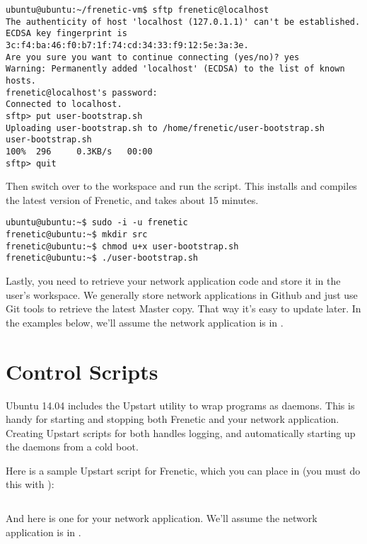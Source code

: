 \begin{verbatim}
ubuntu@ubuntu:~/frenetic-vm$ sftp frenetic@localhost
The authenticity of host 'localhost (127.0.1.1)' can't be established.
ECDSA key fingerprint is 3c:f4:ba:46:f0:b7:1f:74:cd:34:33:f9:12:5e:3a:3e.
Are you sure you want to continue connecting (yes/no)? yes
Warning: Permanently added 'localhost' (ECDSA) to the list of known hosts.
frenetic@localhost's password:
Connected to localhost.
sftp> put user-bootstrap.sh
Uploading user-bootstrap.sh to /home/frenetic/user-bootstrap.sh
user-bootstrap.sh                                                                                 100%  296     0.3KB/s   00:00
sftp> quit
\end{verbatim}

Then switch over to the  workspace and run the script.  This installs and 
compiles the latest version of Frenetic, and takes about 15 minutes.

\begin{verbatim}
ubuntu@ubuntu:~$ sudo -i -u frenetic
frenetic@ubuntu:~$ mkdir src
frenetic@ubuntu:~$ chmod u+x user-bootstrap.sh
frenetic@ubuntu:~$ ./user-bootstrap.sh
\end{verbatim}

Lastly, you need to retrieve your network application code and store it in the 
user's workspace.  We generally store network applications
in Github and just use Git tools to retrieve the latest Master copy.  That way it's easy to 
update later.  In the examples below, we'll assume the network application is in 
.  

\section{Control Scripts}

Ubuntu 14.04 includes the Upstart utility to wrap programs as daemons.  This is handy for 
starting and stopping both Frenetic and your network application.  Creating Upstart scripts
for both handles logging, and automatically starting up the daemons from a cold boot.

Here is a sample Upstart script for Frenetic, which you can place in 
 (you must do this with ):

\inputminted{bash}{code/productionalizing/frenetic.conf} 

And here is one for your network application.  We'll assume the network application is in 
.  

